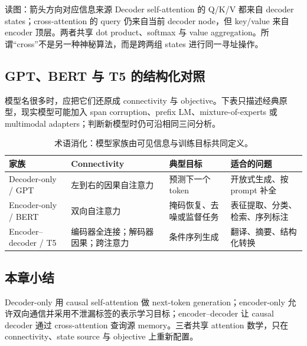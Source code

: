 \begin{knowledgebox}{读图：箭头方向对应信息来源}
Decoder self-attention 的 Q/K/V 都来自 decoder states；cross-attention 的 query 仍来自当前 decoder node，但 key/value 来自 encoder 顶层。两者共享 dot product、softmax 与 value aggregation。所谓“cross”不是另一种神秘算法，而是跨两组 states 进行同一寻址操作。
\end{knowledgebox}

\subsection{GPT、BERT 与 T5 的结构化对照}

模型名很多时，应把它们还原成 connectivity 与 objective。下表只描述经典原型，现实模型可能加入 span corruption、prefix LM、mixture-of-experts 或 multimodal adapters；判断新模型时仍可沿相同三问分析。


\begin{table}[H]
\centering
\small
\begin{tabularx}{\textwidth}{L{2.8cm}L{3.5cm}L{3.2cm}X}
\toprule
家族 & Connectivity & 典型目标 & 适合的问题 \\
\midrule
Decoder-only / GPT & 左到右的因果自注意力 & 预测下一个 token & 开放式生成、按 prompt 补全 \\
Encoder-only / BERT & 双向自注意力 & 掩码恢复、去噪或监督任务 & 表征提取、分类、检索、序列标注 \\
Encoder--decoder / T5 & 编码器全连接；解码器因果；跨注意力 & 条件序列生成 & 翻译、摘要、结构化转换 \\
\bottomrule
\end{tabularx}
\caption{术语消化：模型家族由可见信息与训练目标共同定义。}
\end{table}


\subsection{本章小结}

Decoder-only 用 causal self-attention 做 next-token generation；encoder-only 允许双向通信并采用不泄漏标签的表示学习目标；encoder--decoder 让 causal decoder 通过 cross-attention 查询源 memory。三者共享 attention 数学，只在 connectivity、state source 与 objective 上重新配置。


